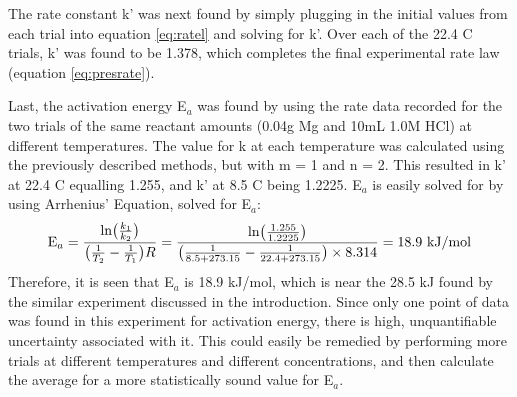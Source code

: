 \documentclass[12pt, letterpaper]{article}
\begin{document}
The rate constant k' was next found by simply plugging in the initial values from each trial into equation \ref{eq:ratel} and solving for k'. Over each of the 22.4 \textdegree C trials, k' was found to be 1.378, which completes the final experimental rate law (equation \ref{eq:presrate}). \\\par

Last, the activation energy E$_a$ was found by using the rate data recorded for the two trials of the same reactant amounts (0.04g Mg and 10mL 1.0M HCl) at different temperatures. The value for k at each temperature was calculated using the previously described methods, but with m = 1 and n = 2. This resulted in k' at 22.4 \textdegree C equalling 1.255, and k' at 8.5 \textdegree C being 1.2225. E$_a$ is easily solved for by using Arrhenius' Equation, solved for E$_a$:
\begin{equation}
\textnormal{E}_a = \frac{\textnormal{ln}\big(\frac{k_1}{k_2}\big)}{\big(\frac{1}{T_2}-\frac{1}{T_1}\big)R}
= \frac{\textnormal{ln}\big(\frac{1.255}{1.2225}\big)}{\big(\frac{1}{8.5+273.15}-\frac{1}{22.4+273.15}\big)\times 8.314} = 18.9 \textnormal{ kJ/mol}
\end{equation}
Therefore, it is seen that E$_a$ is 18.9 kJ/mol, which is near the 28.5 kJ \cite{mg_hcl} found by the similar experiment discussed in the introduction. Since only one point of data was found in this experiment for activation energy, there is high, unquantifiable uncertainty associated with it. This could easily be remedied by performing more trials at different temperatures and different concentrations, and then calculate the average for a more statistically sound value for E$_a$.



\end{document}
